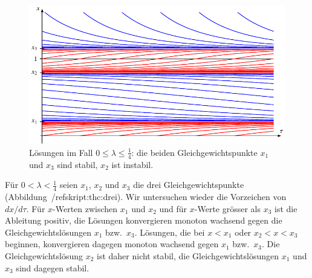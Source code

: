 \begin{figure}
\centering
\includegraphics{chapters/4/drei.pdf}
\caption{Lösungen im Fall $0\le \lambda\le\frac14$: die beiden
Gleichgewichtspunkte $x_1$ und $x_3$ sind stabil, $x_2$ ist instabil.
\label{skript:thc:drei}}
\end{figure}%
Für $0<\lambda<\frac14$ seien
$x_1$, $x_2$ und $x_3$ die drei Gleichgewichtspunkte
(Abbildung~/ref{skript:thc:drei}).
Wir untersuchen wieder die Vorzeichen von $dx/d\tau$. 
Für $x$-Werten zwischen $x_1$ und $x_2$ und für $x$-Werte grösser
als $x_3$ ist die Ableitung positiv, die Lösungen konvergieren monoton
wachsend gegen die Gleichgewichtslösungen $x_1$ bzw.~$x_3$.
Lösungen, die bei $x<x_1$ oder $x_2<x<x_3$ beginnen, konvergieren
dagegen monoton wachsend gegen $x_1$ bzw.~$x_3$.
Die Gleichgewichtslösung $x_2$ ist daher nicht stabil,
die Gleichgewichtslösungen $x_1$ und $x_3$ sind dagegen stabil.


